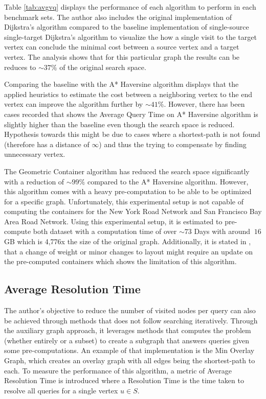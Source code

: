 \documentclass{article}
\begin{document}
Table \ref{tab:avgvq} displays the performance of each algorithm to perform in each benchmark sets. The author also includes the original implementation of Dijkstra's algorithm compared to the baseline implementation of single-source single-target Dijkstra's algorithm to visualize the how a single visit to the target vertex can conclude the minimal cost between a source vertex and a target vertex. The analysis shows that for this particular graph the results can be reduces to $\sim37\%$ of the original search space.

Comparing the baseline with the A* Haversine algorithm displays that the applied heuristics to estimate the cost between a neighboring vertex to the end vertex can improve the algorithm further by $\sim41\%$. However, there has been cases recorded that shows the Average Query Time on A* Haversine algorithm is slightly higher than the baseline even though the search space is reduced. Hypothesis towards this might be due to cases where a shortest-path is not found (therefore has a distance of $\infty$) and thus the trying to compensate by finding unnecessary vertex.

The Geometric Container algorithm has reduced the search space significantly with a reduction of $\sim99\%$ compared to the A* Haversine algorithm. However, this algorithm comes with a heavy pre-computation to be able to be optimized for a specific graph. Unfortunately, this experimental setup is not capable of computing the containers for the New York Road Network and San Francisco Bay Area Road Network. Using this experimental setup, it is estimated to pre-compute both dataset with a computation time of over $\sim73$ Days with around $~16$ GB which is 4,776x the size of the original graph. Additionally, it is stated in \cite{Wagner2005}, that a change of weight or minor changes to layout might require an update on the pre-computed containers which shows the limitation of this algorithm.

\subsection{Average Resolution Time}

The author's objective to reduce the number of visited nodes per query can also be achieved through methods that does not follow searching iteratively. Through the auxiliary graph approach, it leverages methods that computes the problem (whether entirely or a subset) to create a subgraph that answers queries given some pre-computations. An example of that implementation is the Min Overlay Graph, which creates an overlay graph with all edges being the shortest-path to each. To measure the performance of this algorithm, a metric of Average Resolution Time is introduced where a Resolution Time is the time taken to resolve all queries for a single vertex $u \in S$.
\end{document}
